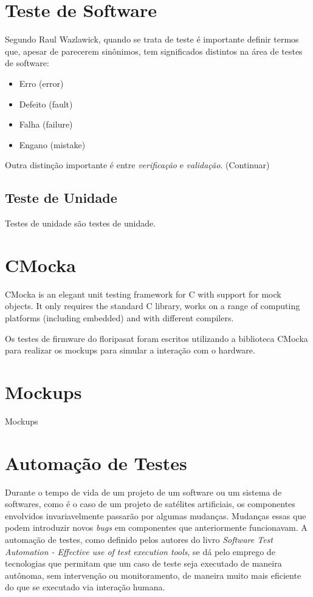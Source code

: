\section{Teste de Software}
\label{section:test}
Segundo Raul Wazlawick\cite{engenharia-software}, quando se trata de teste é importante definir termos que, apesar de parecerem sinônimos, tem significados distintos
na área de testes de software:

\begin{itemize}
    \item Erro (error)
    \item Defeito (fault)
    \item Falha (failure)
    \item Engano (mistake)
\end{itemize}

Outra distinção importante é entre \textit{verificação} e \textit{validação}. (Continuar)

\subsection{Teste de Unidade}
\label{section:unit_test}
Testes de unidade são testes de unidade.


\section{CMocka}
\label{section:cmocka}
CMocka is an elegant unit testing framework for C with support for mock objects. It only requires the standard C library,
works on a range of computing platforms (including embedded) and with different compilers.

Os testes de firmware do floripasat foram escritos utilizando a biblioteca CMocka para realizar os mockups para simular a interação com o hardware.

\section{Mockups}
\label{section:mockups}
Mockups

\section{Automação de Testes}
\label{section:test-automation}

Durante o tempo de vida de um projeto de um software ou um sistema de softwares, como é o caso de um projeto de satélites artificiais,
os componentes envolvidos invariavelmente passarão por algumas mudanças. Mudanças essas que podem introduzir novos \textit{bugs} em
componentes que anteriormente funcionavam. A automação de testes, como definido pelos autores do livro
\textit{Software Test Automation - Effective use of test execution tools}, se dá pelo emprego de tecnologias que permitam que um caso
de teste seja executado de maneira autônoma, sem intervenção ou monitoramento, de maneira muito mais eficiente\cite{software-automation}
do que se executado via interação humana.

